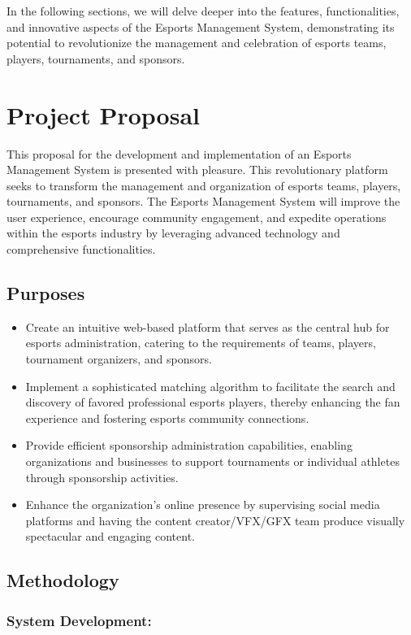 In the following sections, we will delve deeper into the features, functionalities, and innovative aspects of the Esports Management System, demonstrating its potential to revolutionize the management and celebration of esports teams, players, tournaments, and sponsors.

\section{Project Proposal}
This proposal for the development and implementation of an Esports Management System is presented with pleasure. This revolutionary platform seeks to transform the management and organization of esports teams, players, tournaments, and sponsors. The Esports Management System will improve the user experience, encourage community engagement, and expedite operations within the esports industry by leveraging advanced technology and comprehensive functionalities.

\subsection{Purposes}

\begin{itemize}
    \item Create an intuitive web-based platform that serves as the central hub for esports administration, catering to the requirements of teams, players, tournament organizers, and sponsors.
    \item Implement a sophisticated matching algorithm to facilitate the search and discovery of favored professional esports players, thereby enhancing the fan experience and fostering esports community connections.
    \item Provide efficient sponsorship administration capabilities, enabling organizations and businesses to support tournaments or individual athletes through sponsorship activities.
    \item Enhance the organization's online presence by supervising social media platforms and having the content creator/VFX/GFX team produce visually spectacular and engaging content.
\end{itemize}


\subsection{Methodology}

\subsubsection*{System Development:}

